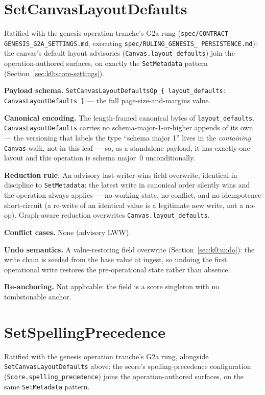 \documentclass[11pt,letterpaper]{report}
\begin{document}
\section{SetCanvasLayoutDefaults}
\label{sec:k0:set-canvas-layout-defaults}

Ratified with the genesis operation tranche's G2a rung (\texttt{spec/CONTRACT\_
GENESIS\_G2A\_SETTINGS.md}, executing \texttt{spec/RULING\_GENESIS\_
PERSISTENCE.md}): the canvas's default layout advisories
(\texttt{Canvas.layout\_defaults}) join the operation-authored surfaces, on
exactly the \texttt{SetMetadata} pattern (Section~\ref{sec:k0:score-settings}).

\textbf{Payload schema.} \texttt{SetCanvasLayoutDefaultsOp \{ layout\_defaults:
CanvasLayoutDefaults \}} --- the full page-size-and-margins value.

\textbf{Canonical encoding.} The length-framed canonical bytes of
\texttt{layout\_defaults}. \texttt{CanvasLayoutDefaults} carries no
schema-major-1-or-higher appends of its own --- the versioning that labels the
type ``schema major 1'' lives in the \emph{containing} \texttt{Canvas} walk,
not in this leaf --- so, as a standalone payload, it has exactly one layout
and this operation is schema major~0 unconditionally.

\textbf{Reduction rule.} An advisory last-writer-wins field overwrite,
identical in discipline to \texttt{SetMetadata}: the latest write in canonical
order silently wins and the operation always applies --- no working state, no
conflict, and no idempotence short-circuit (a re-write of an identical value
is a legitimate new write, not a no-op). Graph-aware reduction overwrites
\texttt{Canvas.layout\_defaults}.

\textbf{Conflict cases.} None (advisory LWW).

\textbf{Undo semantics.} A value-restoring field overwrite
(Section~\ref{sec:k0:undo}): the write chain is seeded from the base value at
ingest, so undoing the first operational write restores the pre-operational
state rather than absence.

\textbf{Re-anchoring.} Not applicable: the field is a score singleton with no
tombstonable anchor.

\section{SetSpellingPrecedence}
\label{sec:k0:set-spelling-precedence}

Ratified with the genesis operation tranche's G2a rung, alongside
\texttt{SetCanvasLayoutDefaults} above: the score's spelling-precedence
configuration (\texttt{Score.spelling\_precedence}) joins the
operation-authored surfaces, on the same \texttt{SetMetadata} pattern.
\end{document}
